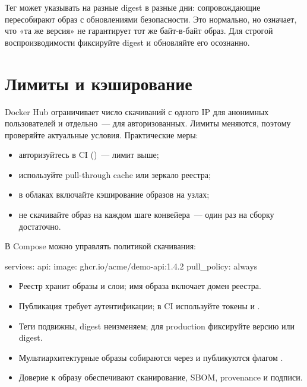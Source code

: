 \begin{warnbox}
Тег  может указывать на разные digest в разные
дни: сопровождающие пересобирают образ с обновлениями безопасности.
Это нормально, но означает, что «та же версия» не гарантирует тот же
байт-в-байт образ. Для строгой воспроизводимости фиксируйте digest
и обновляйте его осознанно.
\end{warnbox}

\section{Лимиты и кэширование}

Docker Hub ограничивает число скачиваний с одного IP для анонимных
пользователей и отдельно~--- для авторизованных. Лимиты меняются,
поэтому проверяйте актуальные условия. Практические меры:

\begin{itemize}
  \item авторизуйтесь в CI ()~--- лимит выше;
  \item используйте pull-through cache или зеркало реестра;
  \item в облаках включайте кэширование образов на узлах;
  \item не скачивайте образ на каждом шаге конвейера~--- один раз
        на сборку достаточно.
\end{itemize}

В Compose можно управлять политикой скачивания:

\begin{code}[language=composeyaml]
services:
  api:
    image: ghcr.io/acme/demo-api:1.4.2
    pull_policy: always
\end{code}

\begin{summarybox}
\begin{itemize}
  \item Реестр хранит образы и слои; имя образа включает домен реестра.
  \item Публикация требует аутентификации; в CI используйте токены
        и .
  \item Теги подвижны, digest неизменяем; для production фиксируйте
        версию или digest.
  \item Мультиархитектурные образы собираются через
         и публикуются флагом .
  \item Доверие к образу обеспечивают сканирование, SBOM, provenance
        и подписи.
\end{itemize}
\end{summarybox}

